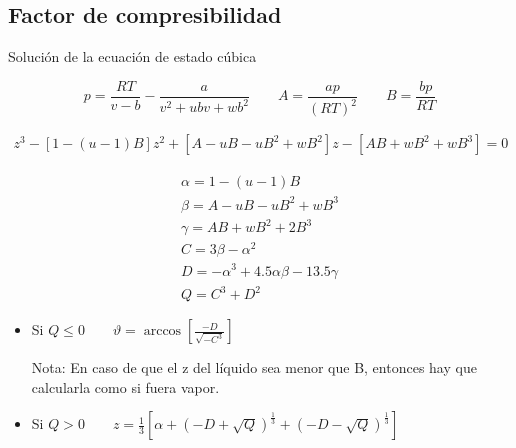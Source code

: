 \subsection{Factor de compresibilidad}

Solución de la ecuación de estado cúbica

\begin{equation}
p=\frac{RT}{v-b} - \frac{a}{v^2 + ubv+ wb^2}
\qquad
A=\frac{ap}{(RT)^2}
\qquad
B=\frac{bp}{RT}
\end{equation}

\begin{eqnarray}
z^3-\left[1-(u-1)B\right]z^2+ \left[A-uB-uB^2 + wB^2\right]z-\left[AB+wB^2+wB^3\right]=0
\end{eqnarray}


\begin{eqnarray}
\alpha = 1-(u-1)B\\
\beta = A -uB-uB^2+wB^3\\
\gamma = AB +wB^2+ 2B^3\\
C = 3\beta - \alpha^2\\
D= - \alpha^3+ 4.5 \alpha \beta -13.5 \gamma\\
Q=C^3+D^2
\end{eqnarray}


\begin{itemize}
\item Si $Q \leq 0 \qquad \vartheta = \arccos \left[\frac{-D}{\sqrt{-C^3}}\right]$
Nota: En caso de que el z del líquido sea menor que B, entonces hay que calcularla como si fuera vapor.
\item Si $Q > 0 \qquad z = \frac{1}{3}\left[\alpha + \left(-D + \sqrt{Q}\right)^{\frac{1}{3}}+ \left(-D - \sqrt{Q}\right)^{\frac{1}{3}} \right]$
\end{itemize}